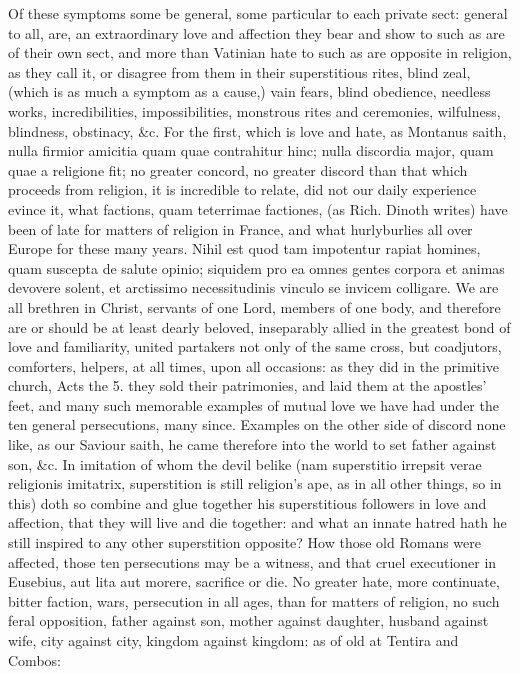 {Of these symptoms some be general, some particular to each private
sect: general to all, are, an extraordinary love and affection they
bear and show to such as are of their own sect, and more than Vatinian
hate to such as are opposite in religion, as they call it, or disagree
from them in their superstitious rites, blind zeal, (which is as much a
symptom as a cause,) vain fears, blind obedience, needless works,
incredibilities, impossibilities, monstrous rites and ceremonies,
wilfulness, blindness, obstinacy, \&c. For the first, which is love and
hate, as Montanus saith, nulla firmior amicitia quam quae
contrahitur hinc; nulla discordia major, quam quae a religione fit; no
greater concord, no greater discord than that which proceeds from
religion, it is incredible to relate, did not our daily experience
evince it, what factions, quam teterrimae factiones, (as Rich.
Dinoth writes) have been of late for matters of religion in France, and
what hurlyburlies all over Europe for these many years. Nihil est quod
tam impotentur rapiat homines, quam suscepta de salute opinio; siquidem
pro ea omnes gentes corpora et animas devovere solent, et arctissimo
necessitudinis vinculo se invicem colligare. We are all brethren in
Christ, servants of one Lord, members of one body, and therefore are or
should be at least dearly beloved, inseparably allied in the greatest
bond of love and familiarity, united partakers not only of the same
cross, but coadjutors, comforters, helpers, at all times, upon all
occasions: as they did in the primitive church, Acts the 5. they sold
their patrimonies, and laid them at the apostles' feet, and many such
memorable examples of mutual love we have had under the ten general
persecutions, many since. Examples on the other side of discord none
like, as our Saviour saith, he came therefore into the world to set
father against son, \&c. In imitation of whom the devil belike
(nam superstitio irrepsit verae religionis imitatrix,
superstition is still religion's ape, as in all other things, so in
this) doth so combine and glue together his superstitious followers in
love and affection, that they will live and die together: and what an
innate hatred hath he still inspired to any other superstition
opposite? How those old Romans were affected, those ten persecutions
may be a witness, and that cruel executioner in Eusebius, aut lita aut
morere, sacrifice or die. No greater hate, more continuate, bitter
faction, wars, persecution in all ages, than for matters of religion,
no such feral opposition, father against son, mother against daughter,
husband against wife, city against city, kingdom against kingdom: as of
old at Tentira and Combos:

}
